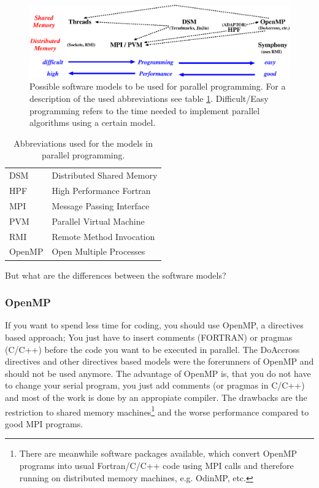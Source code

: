 \begin{figure}[htbp]
  \begin{center}
    \leavevmode
    \includegraphics[width=\textwidth]{Figures/ParallelSoftware.eps}
    \caption{Possible software models to be used for parallel programming. 
      For a description of the used abbreviations see table \ref{tab:ParallelAbbrev}.
      Difficult/Easy programming refers to the time needed to implement
      parallel algorithms using a certain model.}
    \label{fig:ParallelSoftware}
  \end{center}
\end{figure}
\begin{table}[htbp]
  \begin{center}
    \begin{tabular}{ll}
      DSM & Distributed Shared Memory \\
      HPF & High Performance Fortran \\
      MPI & Message Passing Interface \\
      PVM & Parallel Virtual Machine \\
      RMI & Remote Method Invocation \\
      OpenMP & Open Multiple Processes \\
    \end{tabular}
    \caption{Abbreviations used for the models in parallel programming.}
    \label{tab:ParallelAbbrev}
  \end{center}
\end{table}

But what are the differences between the software models?
\subsubsection{OpenMP}
If you want to spend
less time for coding, you should use OpenMP, a directives based approach;
You just have to insert comments (FORTRAN) or pragmas (C/C++) before the 
code you want to be executed in parallel.
The DoAccross directives and other directives based models were the
forerunners of OpenMP and should not be used anymore. The advantage of OpenMP is,
that you do not have to change your serial program, you just add comments
(or pragmas in C/C++) and most of the work is done by an appropiate compiler.
The drawbacks are the restriction to shared memory machines\footnote{There are
meanwhile software packages available, which convert OpenMP programs into 
usual Fortran/C/C++ code using MPI calls and therefore running on
distributed memory machines, e.g. OdinMP, etc.}
and the worse performance compared to good MPI programs.

